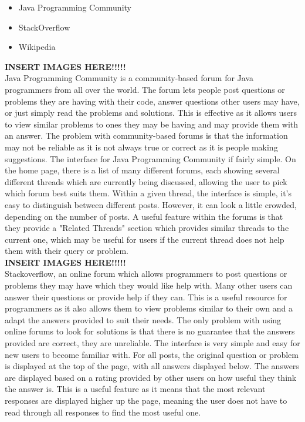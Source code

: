 \documentclass{article}
\begin{document}
\begin{itemize}
\item Java Programming Community
\item StackOverflow
\item Wikipedia
\end{itemize}

\textbf{INSERT IMAGES HERE!!!!!}\\

Java Programming Community is a community-based forum for Java programmers from all over the world. The forum lets people post questions or problems they are having with their code, answer questions other users may have, or just simply read the problems and solutions. This is effective as it allows users to view similar problems to ones they may be having and may provide them with an answer. The problem with community-based forums is that the information may not be reliable as it is not always true or correct as it is people making suggestions. The interface for Java Programming Community if fairly simple. On the home page, there is a list of many different forums, each showing several different threads which are currently being discussed, allowing the user to pick which forum best suits them. Within a given thread, the interface is simple, it's easy to distinguish between different posts. However, it can look a little crowded, depending on the number of posts. A useful feature within the forums is that they provide a "Related Threads" section which provides similar threads to the current one, which may be useful for users if the current thread does not help them with their query or problem.\\

\textbf{INSERT IMAGES HERE!!!!!}\\

Stackoverflow, an online forum which allows programmers to post questions or problems they may have which they would like help with. Many other users can answer their questions or provide help if they can. This is a useful resource for programmers as it also allows them to view problems similar to their own and a adapt the answers provided to suit their needs. The only problem with using online forums to look for solutions is that there is no guarantee that the answers provided are correct, they are unreliable. The interface is very simple and easy for new users to become familiar with. For all posts, the original question or problem is displayed at the top of the page, with all answers displayed below. The answers are displayed based on a rating provided by other users on how useful they think the answer is. This is a useful feature as it means that the most relevant responses are displayed higher up the page, meaning the user does not have to read through all responses to find the most useful one. \\
\end{document}
